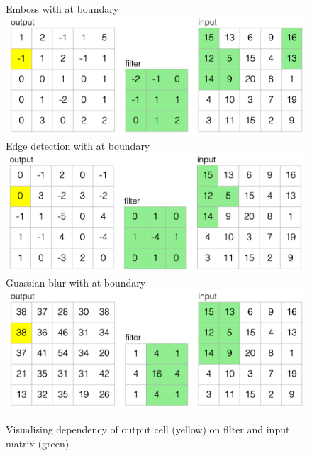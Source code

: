 \begin{figure}[H]
   \subcaptionbox
      {Emboss with  at boundary}
      {\includegraphics[scale=0.4]{fig/example/conv-wrap.png}}
   \subcaptionbox
      {Edge detection with  at boundary}
      {\includegraphics[scale=0.4]{fig/example/conv-extend.png}}
   \subcaptionbox
      {Guassian blur with  at boundary}
      {\includegraphics[scale=0.4]{fig/example/conv-zero.png}}
   \caption{Visualising dependency of output cell (yellow) on filter and input matrix (green)}
\end{figure}
